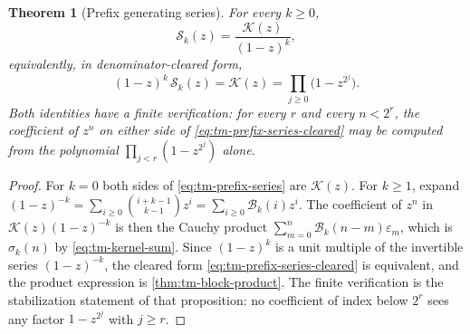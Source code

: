 \documentclass[11pt,oneside]{article}
\newtheorem{theorem}{Theorem}[section]
\theoremstyle{definition}
\theoremstyle{remark}
\begin{document}
\begin{theorem}[Prefix generating series]
\label{thm:tm-generating}
For every $k\ge0$,
\begin{equation}
 \mathcal S_k(z)=\frac{\mathcal K(z)}{(1-z)^k},            \label{eq:tm-prefix-series}
\end{equation}
equivalently, in denominator-cleared form,
\begin{equation}
 (1-z)^k\,\mathcal S_k(z)=\mathcal K(z)=\prod_{j\ge0}\bigl(1-z^{2^j}\bigr).
                                                          \label{eq:tm-prefix-series-cleared}
\end{equation}
Both identities have a finite verification: for every $r$ and every $n<2^r$, the coefficient
of $z^n$ on either side of \eqref{eq:tm-prefix-series-cleared} may be computed from the
polynomial $\prod_{j<r}(1-z^{2^j})$ alone.
\end{theorem}

\begin{proof}
For $k=0$ both sides of \eqref{eq:tm-prefix-series} are $\mathcal K(z)$.  For $k\ge1$,
expand $(1-z)^{-k}=\sum_{i\ge0}\binom{i+k-1}{k-1}z^i=\sum_{i\ge0}\mathcal B_k(i)z^i$.  The
coefficient of $z^n$ in $\mathcal K(z)(1-z)^{-k}$ is then the Cauchy product
$\sum_{m=0}^n\mathcal B_k(n-m)\varepsilon_m$, which is $\sigma_k(n)$ by
\eqref{eq:tm-kernel-sum}.  Since $(1-z)^k$ is a unit multiple of the invertible series
$(1-z)^{-k}$, the cleared form \eqref{eq:tm-prefix-series-cleared} is equivalent, and the
product expression is \cref{thm:tm-block-product}.  The finite verification is the
stabilization statement of that proposition: no coefficient of index below $2^r$ sees any
factor $1-z^{2^j}$ with $j\ge r$.
\end{proof}
\end{document}
